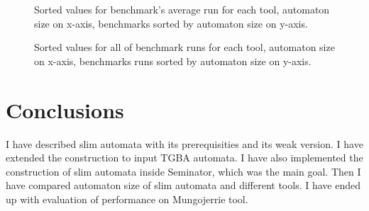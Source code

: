 \documentclass[
	digital,
nolof, nolot
]{fithesis3}
\begin{document}
	\begin{figure}[ht]
		\centering
		\label{Cactus:mungoaverage}
		\caption{Sorted values for benchmark's average run for each tool, automaton size on x-axis, benchmarks sorted by automaton size on y-axis.}
		
	\end{figure}
	\begin{figure}
		\centering
		\label{Cactus:mungoruns}
		\caption{Sorted values for all of benchmark runs for each tool, automaton size on x-axis, benchmarks runs sorted by automaton size on y-axis.}
	
	\end{figure}
	
	\chapter{Conclusions}
	
	I have described slim automata with its prerequisities and its weak version.
	I have extended the construction to input TGBA automata.
	I have also implemented the construction of slim automata inside Seminator, which was the main goal.
	Then I have compared automaton size of slim automata and different tools.
	I have ended up with evaluation of performance on Mungojerrie tool.
\end{document}
